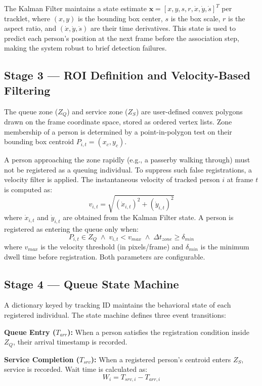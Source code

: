 \documentclass[journal, twocolumn]{IEEEtran}
\begin{document}
The Kalman Filter maintains a state estimate $\mathbf{x} = [x, y, s, r, \dot{x}, \dot{y}, \dot{s}]^T$ per tracklet, where $(x, y)$ is the bounding box center, $s$ is the box scale, $r$ is the aspect ratio, and $(\dot{x}, \dot{y}, \dot{s})$ are their time derivatives. This state is used to predict each person's position at the next frame before the association step, making the system robust to brief detection failures.

\subsection{Stage 3 — ROI Definition and Velocity-Based Filtering}
The queue zone ($Z_Q$) and service zone ($Z_S$) are user-defined convex polygons drawn on the frame coordinate space, stored as ordered vertex lists. Zone membership of a person is determined by a point-in-polygon test on their bounding box centroid $P_{i,t} = (x_c, y_c)$.

A person approaching the zone rapidly (e.g., a passerby walking through) must not be registered as a queuing individual. To suppress such false registrations, a velocity filter is applied. The instantaneous velocity of tracked person $i$ at frame $t$ is computed as:
\begin{equation}
v_{i,t} = \sqrt{(\dot{x}_{i,t})^2 + (\dot{y}_{i,t})^2}
\end{equation}
where $\dot{x}_{i,t}$ and $\dot{y}_{i,t}$ are obtained from the Kalman Filter state. A person is registered as entering the queue only when:
\begin{equation}
P_{i,t} \in Z_Q \;\wedge\; v_{i,t} < v_{max} \;\wedge\; \Delta t_{zone} \geq \delta_{min}
\end{equation}
where $v_{max}$ is the velocity threshold (in pixels/frame) and $\delta_{min}$ is the minimum dwell time before registration. Both parameters are configurable.

\subsection{Stage 4 — Queue State Machine}
A dictionary keyed by tracking ID maintains the behavioral state of each registered individual. The state machine defines three event transitions:

\textbf{Queue Entry ($T_{arr}$):} When a person satisfies the registration condition inside $Z_Q$, their arrival timestamp is recorded.

\textbf{Service Completion ($T_{srv}$):} When a registered person's centroid enters $Z_S$, service is recorded. Wait time is calculated as:
\begin{equation}
W_i = T_{srv,i} - T_{arr,i}
\end{equation}
\end{document}
